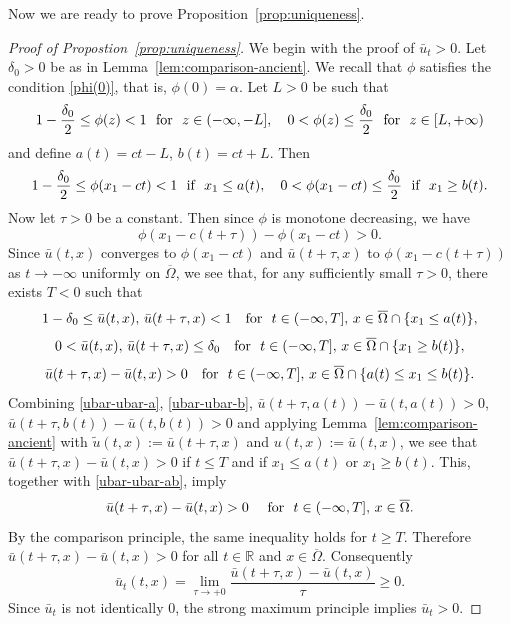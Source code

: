 \documentclass[a4paper,12pt,fullpage]{article}
\numberwithin{equation}{section}
\def\R{{\mathbb R}}
\begin{document}
Now we are ready to prove Proposition~\ref{prop:uniqueness}.

\begin{proof}[Proof of Propostion~\ref{prop:uniqueness}] 
We begin with the proof of $\bar{u}_t>0$. Let $\delta_0>0$ be as in Lemma~\ref{lem:comparison-ancient}. We recall that $\phi$ satisfies the condition \eqref{phi(0)}, that is, $\phi(0)=\alpha$. Let $L>0$ be such that
\[
1-\frac{\delta_0}{2}\leq \phi(z)<1 \ \ \hbox{for}\ \ z\in(-\infty, -L],\quad 
0<\phi(z)\leq \frac{\delta_0}{2}\ \ \hbox{for}\ \ z\in [L,+\infty)
\]
and define $a(t)=ct-L$, $b(t)=ct+L$. Then
\[
1-\frac{\delta_0}{2}\leq\phi(x_1-ct)< 1\ \ \hbox{if}\ \ x_1\leq a(t),\quad 
 0<\phi(x_1-ct)\leq \frac{\delta_0}{2}\ \ \hbox{if}\ \ x_1\geq b(t).
\]
Now let $\tau>0$ be a constant. Then since $\phi$ is monotone decreasing, we have
\[
\phi(x_1-c(t+\tau))-\phi(x_1-ct)>0.
\]
Since $\bar{u}(t,x)$ converges to $\phi(x_1-ct)$ and $\bar{u}(t+\tau,x)$ to $\phi(x_1-c(t+\tau))$ as $t\to-\infty$ uniformly on $\overline{\Omega}$, we see that, for any sufficiently small $\tau>0$, there exists $T<0$ such that
\begin{equation}\label{ubar-ubar-a}
1-\delta_0 \leq \bar{u}(t,x),\,\bar{u}(t+\tau,x)<1\quad \hbox{for}\ \ t\in(-\infty,T],\, x\in \overline{\Omega}\cap\{x_1\leq a(t)\},
\end{equation}
\begin{equation}\label{ubar-ubar-b}
0< \bar{u}(t,x),\,\bar{u}(t+\tau,x)\leq\delta_0 \quad \hbox{for}\ \ t\in(-\infty,T],\, x\in \overline{\Omega}\cap\{x_1\geq b(t)\},
\end{equation}
\begin{equation}\label{ubar-ubar-ab}
\bar{u}(t+\tau,x)-\bar{u}(t,x)>0 \quad \hbox{for}\ \ t\in(-\infty,T],\, x\in \overline{\Omega}\cap\{a(t)\leq x_1\leq b(t)\}.
\end{equation}
Combining \eqref{ubar-ubar-a}, \eqref{ubar-ubar-b}, $\bar{u}(t+\tau,a(t))-\bar{u}(t,a(t))>0$, $\bar{u}(t+\tau,b(t))-\bar{u}(t,b(t))>0$ and applying Lemma~\ref{lem:comparison-ancient} with $\widetilde{u}(t,x):=\bar{u}(t+\tau,x)$ and $u(t,x):=\bar{u}(t,x)$, we see that $\bar{u}(t+\tau,x)-\bar{u}(t,x)>0$ if $t\leq T$ and if $x_1\leq a(t)$ or $x_1\geq b(t)$. This, together with \eqref{ubar-ubar-ab}, imply
\[
\bar{u}(t+\tau,x)-\bar{u}(t,x)>0\quad\ \hbox{for}\ \ t\in(-\infty,T],\,x\in\overline{\Omega}. 
\]
By the comparison principle, the same inequality holds for $t\geq T$. Therefore $\bar{u}(t+\tau,x)-\bar{u}(t,x)>0$ for all $t\in\R$ and $x\in\overline{\Omega}$. Consequently
\[
\bar{u}_t(t,x)=\lim_{\tau\to+0}\frac{\bar{u}(t+\tau,x)-\bar{u}(t,x)}{\tau}\geq 0.
\]
Since $\bar{u}_t$ is not identically $0$, the strong maximum principle implies $\bar{u}_t>0$.


\end{proof}
\end{document}
